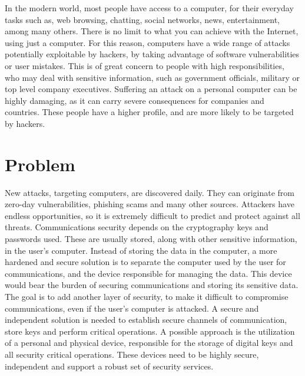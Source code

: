 \cleardoublepage
\label{chap:intro}

In the modern world, most people have access to a computer, for their everyday tasks such as, web browsing, chatting, social networks, news, entertainment, among many others.
There is no limit to what you can achieve with the Internet, using just a computer.
For this reason, computers have a wide range of attacks potentially exploitable by hackers, by taking advantage of software vulnerabilities or user mistakes.
This is of great concern to people with high responsibilities, who may deal with sensitive information, such as government officials, military or top level company executives.
Suffering an attack on a personal computer can be highly damaging, as it can carry severe consequences for companies and countries.
These people have a higher profile, and are more likely to be targeted by hackers.

\section{Problem}\label{chap:intro:problem}

New attacks, targeting computers, are discovered daily.
They can originate from zero-day vulnerabilities, phishing scams and many other sources. Attackers have endless opportunities, so it is extremely difficult to predict and protect against all threats.
Communications security depends on the cryptography keys and passwords used. These are usually stored, along with other sensitive information, in the user's computer.
Instead of storing the data in the computer, a more hardened and secure solution is to separate the computer used by the user for communications, and the device responsible for managing the data. This device would bear the burden of securing communications and storing its sensitive data.
The goal is to add another layer of security, to make it difficult to compromise communications, even if the user's computer is attacked.
A secure and independent solution is needed to establish secure channels of communication, store keys and perform critical operations.%
A possible approach is the utilization of a personal and physical device, responsible for the storage of digital keys and all security critical operations. These devices need to be highly secure, independent and support a robust set of security services. %


